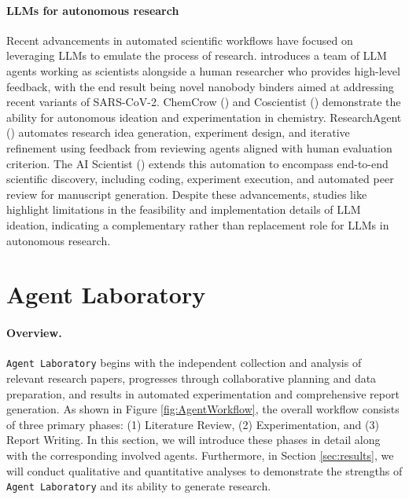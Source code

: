 \documentclass[11pt, a4paper]{gdm_format}
\begin{document}
\paragraph{LLMs for autonomous research}

Recent advancements in automated scientific workflows have focused on leveraging LLMs to emulate the process of research. \cite{swanson2024virtual} introduces a team of LLM agents working as scientists alongside a human researcher who provides high-level feedback, with the end result being novel nanobody binders aimed at addressing recent variants of SARS-CoV-2. ChemCrow (\cite{ m2024augmenting}) and Coscientist (\cite{boiko2023autonomous}) demonstrate the ability for autonomous ideation and experimentation in chemistry. ResearchAgent (\cite{baek2024researchagent}) automates research idea generation, experiment design, and iterative refinement using feedback from reviewing agents aligned with human evaluation criterion. 
The AI Scientist (\cite{lu2024ai}) extends this automation to encompass end-to-end scientific discovery, including coding, experiment execution, and automated peer review for manuscript generation. Despite these advancements, studies like \cite{si2024can} highlight limitations in the feasibility and implementation details of LLM ideation, indicating a complementary rather than replacement role for LLMs in autonomous research. 


\section{Agent Laboratory}

\paragraph{Overview.} \texttt{Agent Laboratory} begins with the independent collection and analysis of relevant research papers, progresses through collaborative planning and data preparation, and results in automated experimentation and comprehensive report generation. 
As shown in Figure \ref{fig:AgentWorkflow}, the overall workflow consists of three primary phases: (1) Literature Review, (2) Experimentation, and (3) Report Writing. 
In this section, we will introduce these phases in detail along with the corresponding involved agents.
Furthermore, in Section \ref{sec:results}, we will conduct qualitative and quantitative analyses to demonstrate the strengths of \texttt{Agent Laboratory} and its ability to generate research.
\end{document}
